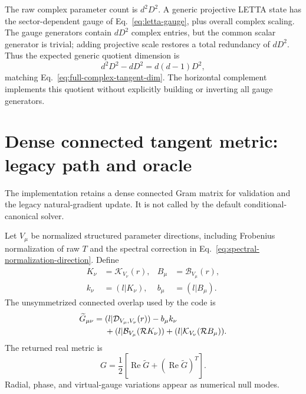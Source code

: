 \documentclass[11pt]{article}
\newcommand{\Res}{\mathcal{R}}
\newcommand{\RePart}{\operatorname{Re}}
\begin{document}
The raw complex parameter count is $d^2D^2$.  A generic projective LETTA state
has the sector-dependent gauge of Eq.~\eqref{eq:letta-gauge}, plus overall
complex scaling.  The gauge generators contain $dD^2$ complex entries, but
the common scalar generator is trivial; adding projective scale restores a
total redundancy of $dD^2$.  Thus the expected generic quotient dimension is
\begin{equation}
  d^2D^2-dD^2=d(d-1)D^2,
  \label{eq:dimension-count-quotient}
\end{equation}
matching Eq.~\eqref{eq:full-complex-tangent-dim}.  The horizontal complement
implements this quotient without explicitly building or inverting all gauge
generators.

\section{Dense connected tangent metric: legacy path and oracle}
\label{sec:dense-gram}

The implementation retains a dense connected Gram matrix for validation and
the legacy natural-gradient update.  It is not called by the default
conditional-canonical solver.

Let $V_\mu$ be normalized structured parameter directions, including
Frobenius normalization of raw $T$ and the spectral correction in
Eq.~\eqref{eq:spectral-normalization-direction}.  Define
\begin{align}
  K_\nu&=\mathcal K_{V_\nu}(r),
  &B_\mu&=\mathcal B_{V_\mu}(r),
  \label{eq:KB-sources}\\
  k_\nu&=(l|K_\nu),
  &b_\mu&=(l|B_\mu).
  \label{eq:KB-parallel}
\end{align}
The unsymmetrized connected overlap used by the code is
\begin{align}
  \widetilde G_{\mu\nu}
  ={}&(l|\mathcal D_{V_\mu,V_\nu}(r))
  -b_\mu k_\nu
  \notag\\
  &+(l|\mathcal B_{V_\mu}(\Res K_\nu))
  +(l|\mathcal K_{V_\nu}(\Res B_\mu)).
  \label{eq:connected-gram}
\end{align}
The returned real metric is
\begin{equation}
  G=\frac{1}{2}\left[
    \RePart\widetilde G+(\RePart\widetilde G)^T
  \right].
  \label{eq:symmetrized-gram}
\end{equation}
Radial, phase, and virtual-gauge variations appear as numerical null modes.
\end{document}
